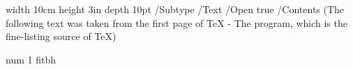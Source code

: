 


\doublecolumns
\vsize=4.4in

\relax      %



\pdfpagewidth=8.26in    %

\pdfpageheight=11.69in  %


\pdfannot               %
    width 10cm          %
    height 3in          %
    depth 10pt          %
{                       %
    /Subtype /Text     %
    /Open true      
    /Contents 
        (The following text was taken from the  first page of TeX - The
         program, which  is the fine-listing source of TeX)
}      

\pdfdest                %
    num 1               %
    fitbh               %


